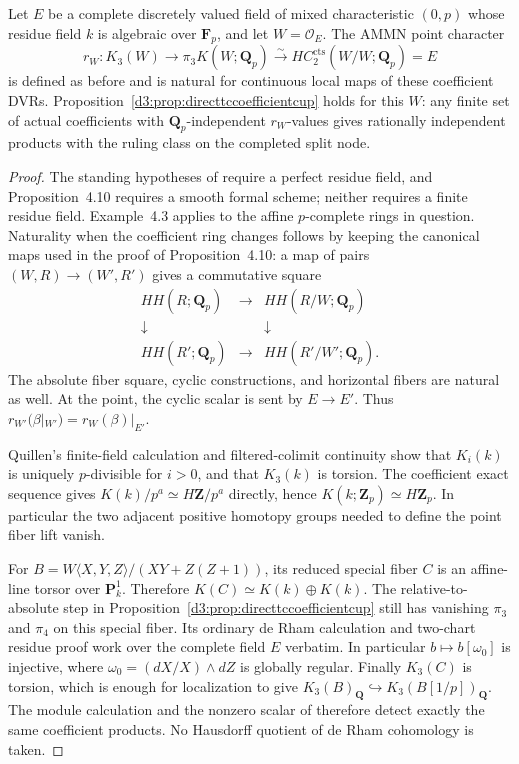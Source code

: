 \begin{lemma}\label{d3:lem:directtcperfectcoeffcup}
Let $E$ be a complete discretely valued field of mixed characteristic
$(0,p)$ whose residue field $k$ is algebraic over $\mathbf F_p$, and
let $W=\mathcal O_E$. The AMMN point character
\[
 r_W:K_3(W)\longrightarrow\pi_3K(W;\mathbf Q_p)
       \xrightarrow{\sim}HC_2^{\mathrm{cts}}(W/W;\mathbf Q_p)=E
\]
is defined as before and is natural for continuous local maps of
these coefficient DVRs. Proposition~\ref{d3:prop:directtccoefficientcup}
holds for this $W$: any finite set of actual coefficients with
$\mathbf Q_p$-independent $r_W$-values gives rationally independent
products with the ruling class on the completed split node.
\end{lemma}
\begin{proof}
The standing hypotheses of \cite[Section~4.1]{AMMN} require a perfect
residue field, and Proposition~4.10 requires a smooth formal scheme;
neither requires a finite residue field. Example~4.3 applies to the
affine $p$-complete rings in question. Naturality when the coefficient
ring changes follows by keeping the canonical maps used in the proof
of Proposition~4.10: a map of pairs $(W,R)\to(W',R')$ gives a
commutative square
\[
\begin{matrix}
 HH(R;\mathbf Q_p)&\longrightarrow&HH(R/W;\mathbf Q_p)\\
 \downarrow&&\downarrow\\
 HH(R';\mathbf Q_p)&\longrightarrow&HH(R'/W';\mathbf Q_p).
\end{matrix}
\]
The absolute fiber square, cyclic constructions, and horizontal
fibers are natural as well. At the point, the cyclic scalar is sent
by $E\to E'$. Thus $r_{W'}(\beta|_{W'})=r_W(\beta)|_{E'}$.

Quillen's finite-field calculation and filtered-colimit continuity
show that $K_i(k)$ is uniquely $p$-divisible for $i>0$, and that
$K_3(k)$ is torsion. The coefficient exact sequence gives
$K(k)/p^a\simeq H\mathbf Z/p^a$ directly, hence
$K(k;\mathbf Z_p)\simeq H\mathbf Z_p$. In particular the two adjacent
positive homotopy groups needed to define the point fiber lift vanish.

For $B=W\langle X,Y,Z\rangle/(XY+Z(Z+1))$, its reduced special fiber
$C$ is an affine-line torsor over $\mathbf P^1_k$. Therefore
$K(C)\simeq K(k)\oplus K(k)$. The relative-to-absolute step in
Proposition~\ref{d3:prop:directtccoefficientcup} still has vanishing
$\pi_3$ and $\pi_4$ on this special fiber. Its ordinary de Rham
calculation and two-chart residue proof work over the complete field
$E$ verbatim. In particular $b\mapsto b[\omega_0]$ is injective,
where $\omega_0=(dX/X)\wedge dZ$ is globally regular. Finally
$K_3(C)$ is torsion, which is enough for localization to give
$K_3(B)_{\mathbf Q}\hookrightarrow K_3(B[1/p])_{\mathbf Q}$.
The module calculation and the nonzero scalar of
\cite[Proposition~4.12]{AMMN} therefore detect exactly the same
coefficient products. No Hausdorff quotient of de Rham cohomology
is taken.
\end{proof}

